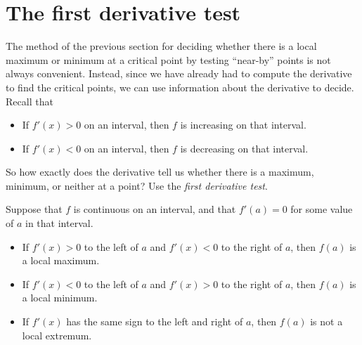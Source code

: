 \documentclass{ximera}
\begin{document}
\begin{example}
\begin{explanation}
\begin{image}
\end{image}
\end{explanation}
\end{example}






\section{The first derivative test}

The method of the previous section for deciding whether there is a
local maximum or minimum at a critical point by testing ``near-by''
points is not always convenient. Instead, since we have already had to
compute the derivative to find the critical points, we can use
information about the derivative to decide. Recall that
\begin{itemize}
\item If $f'(x) >0$ on an interval, then $f$ is increasing on that interval.
\item If $f'(x) <0$ on an interval, then $f$ is decreasing on that interval.
\end{itemize}

So how exactly does the derivative tell us whether there is a maximum,
minimum, or neither at a point? Use the \textit{first derivative test}.

\begin{theorem}\label{T:fdt}
Suppose that $f$ is continuous on an interval, and that $f'(a)=0$ for
some value of $a$ in that interval.
\begin{itemize}
\item If $f'(x)>0$ to the left of $a$ and $f'(x)<0$ to the right of
  $a$, then $f(a)$ is a local maximum.
\item If $f'(x)<0$ to the left of $a$ and $f'(x)>0$ to the right of
  $a$, then $f(a)$ is a local minimum.
\item If $f'(x)$ has the same sign to the left and right of $a$,
  then $f(a)$ is not a local extremum.
\end{itemize}
\end{theorem}
\end{document}

